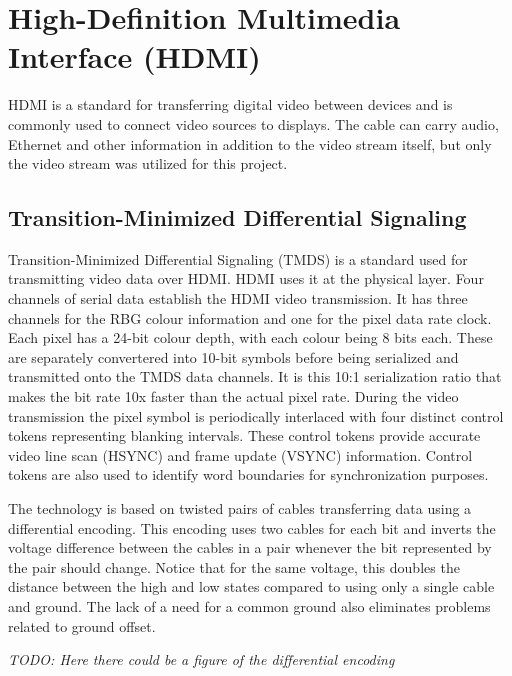 \section{High-Definition Multimedia Interface (HDMI)}
HDMI is a standard for transferring digital video between devices and is commonly used to connect video sources to displays.
The cable can carry audio, Ethernet and other information in addition to the video stream itself, but only the video stream was utilized for this project.

\subsection{Transition-Minimized Differential Signaling}
Transition-Minimized Differential Signaling (TMDS) is a standard used for transmitting video data over HDMI.
HDMI uses it at the physical layer.
Four channels of serial data establish the HDMI video transmission.
It has three channels for the RBG colour information and one for the pixel data rate clock.
Each pixel has a 24-bit colour depth, with each colour being 8 bits each.
These are separately convertered into 10-bit symbols before being serialized and transmitted onto the TMDS data channels.
It is this 10:1 serialization ratio that makes the bit rate 10x faster than the actual pixel rate.
During the video transmission the pixel symbol is periodically interlaced with four distinct control tokens representing blanking intervals.
These control tokens provide accurate video line scan (HSYNC) and frame update (VSYNC) information.
Control tokens are also used to identify word boundaries for synchronization purposes.

The technology is based on twisted pairs of cables transferring data using a differential encoding.
This encoding uses two cables for each bit and inverts the voltage difference between the cables in a pair whenever the bit represented by the pair should change.
Notice that for the same voltage, this doubles the distance between the high and low states compared to using only a single cable and ground.
The lack of a need for a common ground also eliminates problems related to ground offset.

\emph{TODO: Here there could be a figure of the differential encoding}

